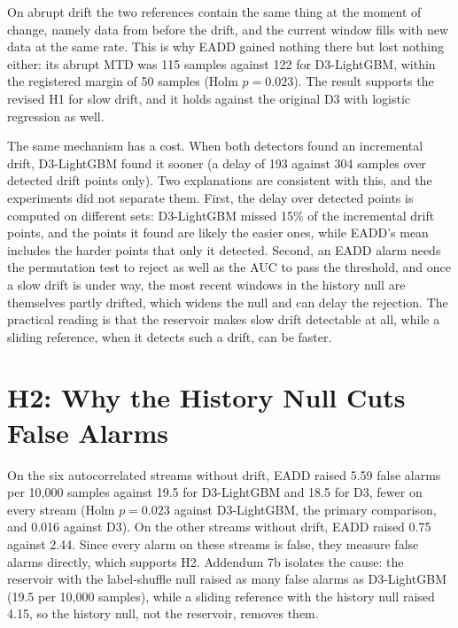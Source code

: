 On abrupt drift the two references contain the same thing at the moment of change, namely data from before the drift, and the current window fills with new data at the same rate. This is why EADD gained nothing there but lost nothing either: its abrupt MTD was 115 samples against 122 for D3-LightGBM, within the registered margin of 50 samples (Holm $p = 0.023$). The result supports the revised H1 for slow drift, and it holds against the original D3 with logistic regression as well.

The same mechanism has a cost. When both detectors found an incremental drift, D3-LightGBM found it sooner (a delay of 193 against 304 samples over detected drift points only). Two explanations are consistent with this, and the experiments did not separate them. First, the delay over detected points is computed on different sets: D3-LightGBM missed 15\% of the incremental drift points, and the points it found are likely the easier ones, while EADD's mean includes the harder points that only it detected. Second, an EADD alarm needs the permutation test to reject as well as the AUC to pass the threshold, and once a slow drift is under way, the most recent windows in the history null are themselves partly drifted, which widens the null and can delay the rejection. The practical reading is that the reservoir makes slow drift detectable at all, while a sliding reference, when it detects such a drift, can be faster.

\section{H2: Why the History Null Cuts False Alarms}
\label{sec:disc-h2}

On the six autocorrelated streams without drift, EADD raised 5.59 false alarms per 10,000 samples against 19.5 for D3-LightGBM and 18.5 for D3, fewer on every stream (Holm $p = 0.023$ against D3-LightGBM, the primary comparison, and 0.016 against D3). On the other streams without drift, EADD raised 0.75 against 2.44. Since every alarm on these streams is false, they measure false alarms directly, which supports H2. Addendum 7b isolates the cause: the reservoir with the label-shuffle null raised as many false alarms as D3-LightGBM (19.5 per 10,000 samples), while a sliding reference with the history null raised 4.15, so the history null, not the reservoir, removes them.

